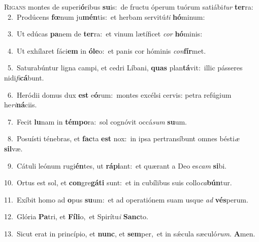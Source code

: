 \lettrine{\initial\textcolor{\initialcolor}{R}}{igans} montes de superi\-\textbf{ó}\-ribus \textbf{su}\-is:~\star de fructu óperum tuórum satiábi\textit{tur} \textbf{ter}\-ra:\\
{\numbfont\textcolor{\numbcolor}{~2.}}~Prodúcens \textbf{fœ}\-num ju\-\textbf{mén}\-tis:~\star et herbam servitú\textit{ti} \textbf{hó}\-minum:\par
{\numbfont\textcolor{\numbcolor}{~3.}}~Ut edúcas \textbf{pa}\-nem de \textbf{ter}\-ra:~\star et vinum lætíficet \textit{cor} \textbf{hó}\-minis:\par
{\numbfont\textcolor{\numbcolor}{~4.}}~Ut exhílaret fáci\textbf{em} in \textbf{ó}\-\textbf{le}o:~\star et panis cor hóminis \textit{con}\-\textbf{fír}met.\par
{\numbfont\textcolor{\numbcolor}{~5.}}~Saturabúntur ligna campi, et cedri Líbani, \textbf{quas} plan\-\textbf{tá}\-vit:~\star illic pásseres nidi\-\textit{fi}\-\textbf{cá}bunt.\par
{\numbfont\textcolor{\numbcolor}{~6.}}~Heródii domus dux \textbf{est} e\-\textbf{ó}\-rum:~\star montes excélsi cervis: petra refúgium he\-\textit{ri}\-\textbf{ná}ciis.\par
{\numbfont\textcolor{\numbcolor}{~7.}}~Fecit \textbf{lu}\-nam in \textbf{tém}\-\textbf{po}ra:~\star sol cognóvit occá\textit{sum} \textbf{su}\-um.\par
{\numbfont\textcolor{\numbcolor}{~8.}}~Posuísti ténebras, et \textbf{fac}\-ta \textbf{est} nox:~\star in ipsa pertransíbunt omnes bésti\textit{æ} \textbf{sil}\-væ.\par
{\numbfont\textcolor{\numbcolor}{~9.}}~Cátuli leónum rugi\-\textbf{én}\-tes, ut \textbf{rá}\-\textbf{pi}ant:~\star et quærant a Deo es\textit{cam} \textbf{si}\-bi.\par
{\numbfont\textcolor{\numbcolor}{10.}}~Ortus est sol, et \textbf{con}\-gre\-\textbf{gá}\-\textbf{ti} sunt:~\star et in cubílibus suis collo\-\textit{ca}\-\textbf{bún}tur.\par
{\numbfont\textcolor{\numbcolor}{11.}}~Exíbit homo ad \textbf{o}\-pus \textbf{su}\-um:~\star et ad operatiónem suam usque \textit{ad} \textbf{vés}\-perum.\par
{\numbfont\textcolor{\numbcolor}{12.}}~Glória \textbf{Pa}\-tri, et \textbf{Fí}\-\textbf{li}o,~\star et Spirítu\textit{i} \textbf{Sanc}\-to.\par
{\numbfont\textcolor{\numbcolor}{13.}}~Sicut erat in princípio, et \textbf{nunc}\-, et \textbf{sem}\-per,~\star et in sǽcula sæculó\-\textit{rum}\-. \textbf{A}\-men.\par

